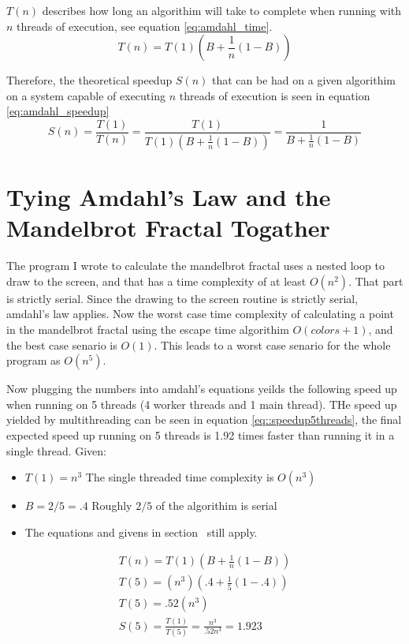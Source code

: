 \documentclass[10pt,oneside,letter]{article}
\begin{document}
$T(n)$ describes how long an algorithim will take to complete when running
with $n$ threads of execution, see equation \eqref{eq:amdahl_time}.
\begin{equation} \label{eq:amdahl_time}
    T(n) = T(1)(B + \frac{1}{n}(1-B))
\end{equation}

Therefore, the theoretical speedup $S(n)$ that can be had on a given algorithim
on a system capable of executing $n$ threads of execution is seen in equation
\eqref{eq:amdahl_speedup}
\begin{equation} \label{eq:amdahl_speedup}
    S(n) = \frac{T(1)}{T(n)}
         = \frac{T(1)}{T(1)(B+\frac{1}{n}(1-B))}
         = \frac{1}{B+\frac{1}{n}(1-B)}
\end{equation}

\section{Tying Amdahl's Law and the Mandelbrot Fractal Togather}
The program I wrote to calculate the mandelbrot fractal uses a nested loop to
draw to the screen, and that has a time complexity of at least $O(n^2)$. That
part is strictly serial. Since the drawing to the screen routine is strictly
serial, amdahl's law applies. Now the worst case time complexity of calculating a
point in the mandelbrot fractal using the escape time algorithim $O({colors} + 1)$,
and the best case senario is $O(1)$. This leads to a worst case senario for the
whole program as $O(n^5)$.

Now plugging the numbers into amdahl's equations yeilds the following speed up
when running on 5 threads (4 worker threads and 1 main thread). THe speed up
yielded by multithreading can be seen in equation \eqref{eq::speedup5threads},
the final expected speed up running on 5 threads is 1.92 times faster than running
it in a single thread.
Given:
\begin{itemize}
    \item $T(1) = n^3$ The single threaded time complexity is $O(n^3)$
    \item $B = 2/5 = .4$ Roughly $2/5$ of the algorithim is serial
    \item The equations and givens in section~\pageref{sec:Ahmdahl's Law} still apply.
\end{itemize}

\begin{equation} \label{eq:speedup5threads}
    \begin{align*}
        T(n) = T(1)(B + \frac{1}{n}(1-B))\\
        T(5) = (n^3)(.4 + \frac{1}{5}(1-.4))\\
        T(5) = .52(n^3)\\
        S(5) = \frac{T(1)}{T(5)} = \frac{n^3}{.52n^3} = 1.923
    \end{align*}
\end{equation}
\end{document}
